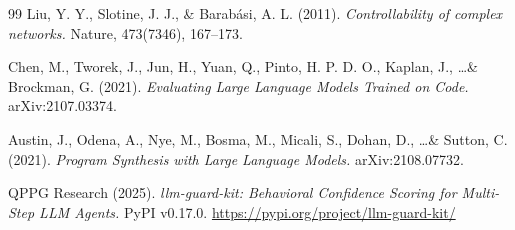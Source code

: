 \documentclass[11pt,a4paper]{article}
\begin{document}
\begin{thebibliography}{99}
Liu, Y. Y., Slotine, J. J., \& Barab{\'a}si, A. L. (2011).
\emph{Controllability of complex networks.}
Nature, 473(7346), 167--173.

Chen, M., Tworek, J., Jun, H., Yuan, Q., Pinto, H. P. D. O., Kaplan, J., \ldots \& Brockman, G. (2021).
\emph{Evaluating Large Language Models Trained on Code.}
arXiv:2107.03374.

Austin, J., Odena, A., Nye, M., Bosma, M., Micali, S., Dohan, D., \ldots \& Sutton, C. (2021).
\emph{Program Synthesis with Large Language Models.}
arXiv:2108.07732.

QPPG Research (2025).
\emph{llm-guard-kit: Behavioral Confidence Scoring for Multi-Step LLM Agents.}
PyPI v0.17.0. \url{https://pypi.org/project/llm-guard-kit/}

\end{thebibliography}
\end{document}
